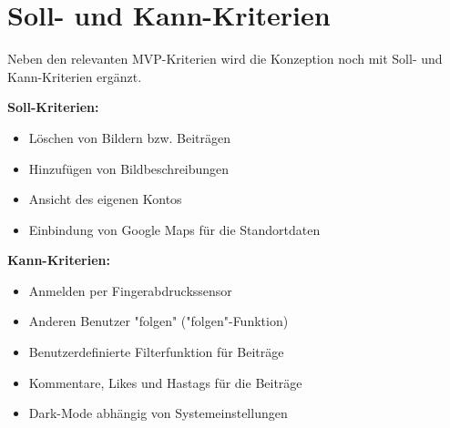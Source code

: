 \section{Soll- und Kann-Kriterien\label{sec2.3:Unterpunkt-3}}

Neben den relevanten MVP-Kriterien wird die Konzeption noch mit Soll- und Kann-Kriterien ergänzt.

\textbf{Soll-Kriterien:}

\begin{itemize}
    \item Löschen von Bildern bzw. Beiträgen
    \item Hinzufügen von Bildbeschreibungen
    \item Ansicht des eigenen Kontos
    \item Einbindung von Google Maps für die Standortdaten
\end{itemize}

\textbf{Kann-Kriterien:}

\begin{itemize}
    \item Anmelden per Fingerabdruckssensor
    \item Anderen Benutzer "folgen" ("folgen"-Funktion)
    \item Benutzerdefinierte Filterfunktion für Beiträge
    \item Kommentare, Likes und Hastags für die Beiträge
    \item Dark-Mode abhängig von Systemeinstellungen
\end{itemize}